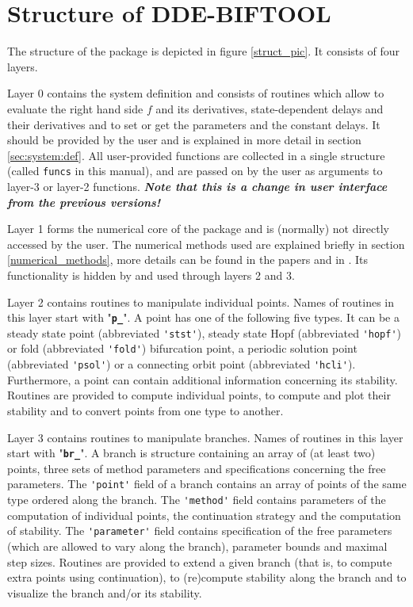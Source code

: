 \documentclass[10pt]{scrartcl}
\newcommand{\DDEBIFCODE}{\textsc{DDE-BIFTOOL}}
\newcommand{\file}[1]{\textbf{\texttt{#1}}}
\newcommand{\blist}[1]{\mbox{\lstinline!#1!}}
\begin{document}
\section{Structure of {\DDEBIFCODE}}\label{code_struct}

The structure of the package is depicted in figure \ref{struct_pic}.
It consists of four layers. 

Layer 0 contains the system definition and consists of routines which
allow to evaluate the right hand side $f$ and its derivatives,
state-dependent delays and their derivatives and to set or get the
parameters and the constant delays.  It should be provided by the user
and is explained in more detail in section \ref{sec:system:def}.  All
user-provided functions are collected in a single structure (called
\blist{funcs} in this manual), and are passed on by the user as
arguments to layer-3 or layer-2 functions. \textbf{\emph{Note that this is a change in user interface from the previous versions!}}

Layer 1 forms the numerical core of the package and is (normally)
not directly accessed by the user. The numerical methods used
are explained
briefly in section \ref{numerical_methods}, more
details can be found in the papers 
\cite{Luzy96,Enge99a,Enge99b,en_d01,engel01,luz01,homoclinic}
and in \cite{Enge00}. Its functionality is hidden by and used
through layers 2 and 3.

Layer 2 contains routines to manipulate individual points.  Names of
routines in this layer start with "\file{p\_}".  A point has one of
the following five types.  It can be a steady state point (abbreviated
\blist{'stst'}), steady state Hopf (abbreviated \blist{'hopf'}) or
fold (abbreviated \blist{'fold'}) bifurcation point, a periodic solution point
(abbreviated \blist{'psol'}) or a connecting orbit point (abbreviated
\blist{'hcli'}). Furthermore, a point can contain additional information
concerning its stability.  Routines are provided to compute individual
points, to compute and plot their stability and to convert points from
one type to another.

Layer 3 contains routines to manipulate branches.  Names of routines
in this layer start with "\file{br\_}". A branch is structure
containing an array of (at least two) points, three sets of method
parameters and specifications concerning the free parameters.  The
\blist{'point'} field of a branch contains an array of points of the
same type ordered along the branch.  The \blist{'method'} field
contains parameters of the computation of individual points, the
continuation strategy and the computation of stability.  The
\blist{'parameter'} field contains specification
of the free parameters (which are allowed to vary along the branch),
parameter bounds and maximal step sizes.  Routines are provided to
extend a given branch (that is, to compute extra points using
continuation), to (re)compute stability along the branch and to
visualize the branch and/or its stability.
\end{document}
